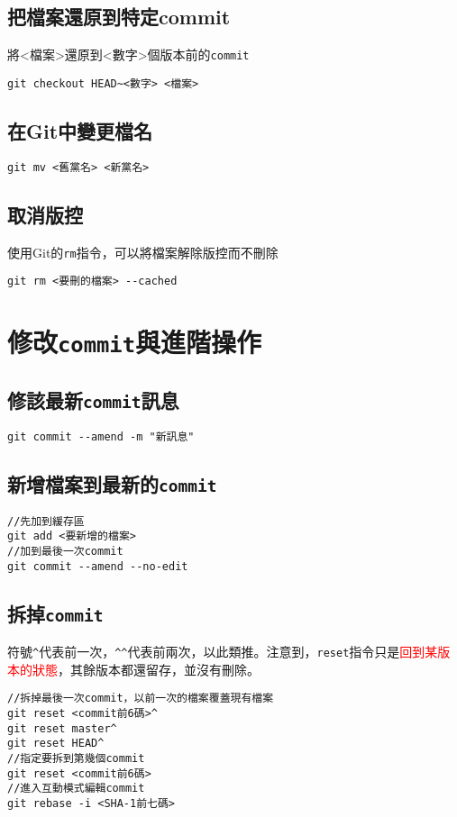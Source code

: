 \documentclass{article}
\newcommand{\rtext}[1]{\textcolor{red}{#1}}
\newcommand{\code}[1]{\texttt{#1}}
\begin{document}
\subsection{把檔案還原到特定commit}
將<檔案>還原到<數字>個版本前的\code{commit}
\begin{lstlisting}[language=git]
git checkout HEAD~<數字> <檔案>
\end{lstlisting}

\subsection{在Git中變更檔名}
\begin{lstlisting}[language=git]
	git mv <舊黨名> <新黨名>
\end{lstlisting}

\subsection{取消版控}
使用Git的\texttt{rm}指令，可以將檔案解除版控而不刪除
\begin{lstlisting}[language=git]
git rm <要刪的檔案> --cached
\end{lstlisting}

\section{修改\texttt{commit}與進階操作}
\subsection{修該最新\code{commit}訊息}
\begin{lstlisting}[language=git]
git commit --amend -m "新訊息"
\end{lstlisting}

\subsection{新增檔案到最新的\code{commit}}
\begin{lstlisting}[language=git]
//先加到緩存區
git add <要新增的檔案>
//加到最後一次commit
git commit --amend --no-edit
\end{lstlisting}

\subsection{拆掉\code{commit}}
符號\code{\^{}}代表前一次，\code{\^{}\^{}}代表前兩次，以此類推。注意到，\code{reset}指令只是\rtext{回到某版本的狀態}，其餘版本都還留存，並沒有刪除。
\begin{lstlisting}[language=git]
//拆掉最後一次commit，以前一次的檔案覆蓋現有檔案
git reset <commit前6碼>^
git reset master^
git reset HEAD^
//指定要拆到第幾個commit
git reset <commit前6碼>
//進入互動模式編輯commit
git rebase -i <SHA-1前七碼>
\end{lstlisting}
\end{document}

